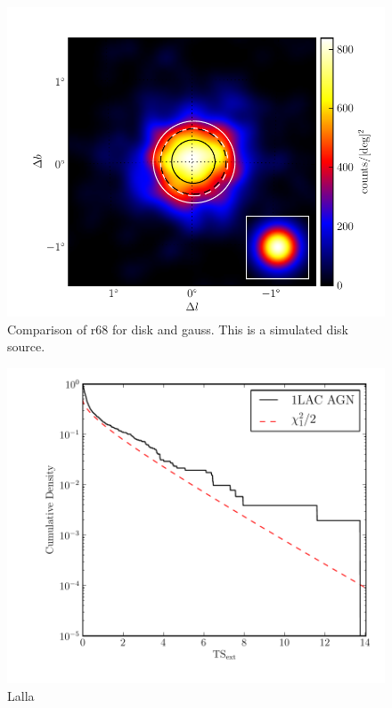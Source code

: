 \documentclass[preprint]{aastex}
\begin{document}
  \begin{figure}
    \begin{center}
      \includegraphics{mc_plots/compare_r68.pdf}
    \end{center}
    \caption{Comparison of r68 for disk and gauss. This is a simulated disk source.
    }\label{compare_r68}
  \end{figure}

\begin{figure}
  \begin{center}
    \includegraphics{source_plots/agn.pdf}
    \end{center}
    \caption{Lalla
    }\label{agn_ts_ext}
  \end{figure}
\end{document}

